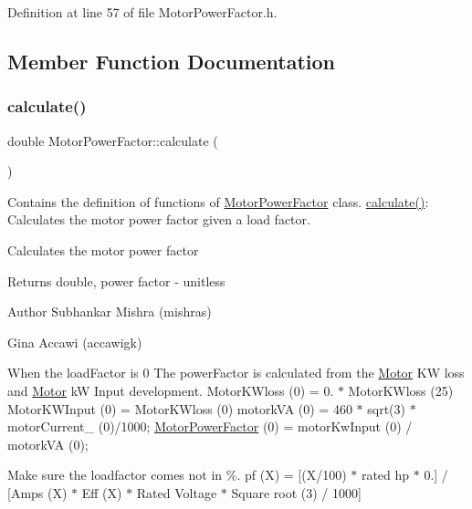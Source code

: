 Definition at line 57 of file Motor\+Power\+Factor.\+h.



\subsection{Member Function Documentation}
\mbox{\label{class_motor_power_factor_ac9d5742db4a371bc4e15d5b29d335b6e}} 
\subsubsection{\texorpdfstring{calculate()}{calculate()}\hspace{0.1cm}{\footnotesize\ttfamily [1/3]}}
{\footnotesize\ttfamily double Motor\+Power\+Factor\+::calculate (\begin{DoxyParamCaption}{ }\end{DoxyParamCaption})}



Contains the definition of functions of \hyperlink{class_motor_power_factor}{Motor\+Power\+Factor} class. \hyperlink{class_motor_power_factor_ac9d5742db4a371bc4e15d5b29d335b6e}{calculate()}\+: Calculates the motor power factor given a load factor. 

Calculates the motor power factor

\begin{DoxyReturn}{Returns}
double, power factor -\/ unitless
\end{DoxyReturn}
\begin{DoxyAuthor}{Author}
Subhankar Mishra (mishras) 

Gina Accawi (accawigk) 
\end{DoxyAuthor}
When the load\+Factor is 0 The power\+Factor is calculated from the \hyperlink{class_motor}{Motor} KW loss and \hyperlink{class_motor}{Motor} kW Input development. Motor\+K\+Wloss (0) = 0. $\ast$ Motor\+K\+Wloss (25) Motor\+K\+W\+Input (0) = Motor\+K\+Wloss (0) motork\+VA (0) = 460 $\ast$ sqrt(3) $\ast$ motor\+Current\+\_\+ (0)/1000; \hyperlink{class_motor_power_factor}{Motor\+Power\+Factor} (0) = motor\+Kw\+Input (0) / motork\+VA (0);

Make sure the loadfactor comes not in \%. pf (X) = \mbox{[}(X/100) $\ast$ rated hp $\ast$ 0.\mbox{]} / \mbox{[}Amps (X) $\ast$ Eff (X) $\ast$ Rated Voltage $\ast$ Square root (3) / 1000\mbox{]}

